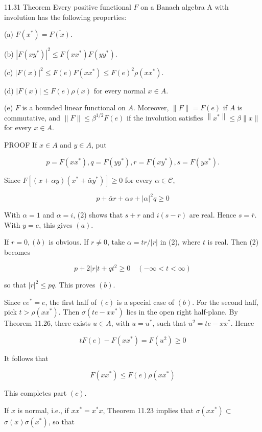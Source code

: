 \documentclass[10pt]{article}
\begin{document}
11.31 Theorem Every positive functional $F$ on a Banach algebra A with involution has the following properties:

(a) $F\left(x^{*}\right)=\overline{F(x)}$.

(b) $\left|F\left(x y^{*}\right)\right|^{2} \leq F\left(x x^{*}\right) F\left(y y^{*}\right)$.

(c) $|F(x)|^{2} \leq F(e) F\left(x x^{*}\right) \leq F(e)^{2} \rho\left(x x^{*}\right)$.

(d) $|F(x)| \leq F(e) \rho(x)$ for every normal $x \in A$.

(e) $F$ is a bounded linear functional on $A$. Moreover, $\|F\|=F(e)$ if $A$ is commutative, and $\|F\| \leq \beta^{1 / 2} F(e)$ if the involution satisfies $\left\|x^{*}\right\| \leq \beta\|x\|$ for every $x \in A$.

PROOF If $x \in A$ and $y \in A$, put

$$
p=F\left(x x^{*}\right), q=F\left(y y^{*}\right), r=F\left(x y^{*}\right), s=F\left(y x^{*}\right) .
$$

Since $F\left[(x+\alpha y)\left(x^{*}+\bar{\alpha} y^{*}\right)\right] \geq 0$ for every $\alpha \in \mathscr{C}$,

$$
p+\bar{\alpha} r+\alpha s+|\alpha|^{2} q \geq 0
$$

With $\alpha=1$ and $\alpha=i$, (2) shows that $s+r$ and $i(s-r)$ are real. Hence $s=\bar{r}$. With $y=e$, this gives $(a)$.

If $r=0,(b)$ is obvious. If $r \neq 0$, take $\alpha=t r /|r|$ in (2), where $t$ is real. Then (2) becomes

$$
p+2|r| t+q t^{2} \geq 0 \quad(-\infty<t<\infty)
$$

so that $|r|^{2} \leq p q$. This proves $(b)$.

Since $e e^{*}=e$, the first half of $(c)$ is a special case of $(b)$. For the second half, pick $t>\rho\left(x x^{*}\right)$. Then $\sigma\left(t e-x x^{*}\right)$ lies in the open right half-plane. By Theorem 11.26, there exists $u \in A$, with $u=u^{*}$, such that $u^{2}=t e-x x^{*}$. Hence

$$
t F(e)-F\left(x x^{*}\right)=F\left(u^{2}\right) \geq 0
$$

It follows that

$$
F\left(x x^{*}\right) \leq F(e) \rho\left(x x^{*}\right)
$$

This completes part $(c)$.

If $x$ is normal, i.e., if $x x^{*}=x^{*} x$, Theorem 11.23 implies that $\sigma\left(x x^{*}\right) \subset$ $\sigma(x) \sigma\left(x^{*}\right)$, so that
\end{document}
